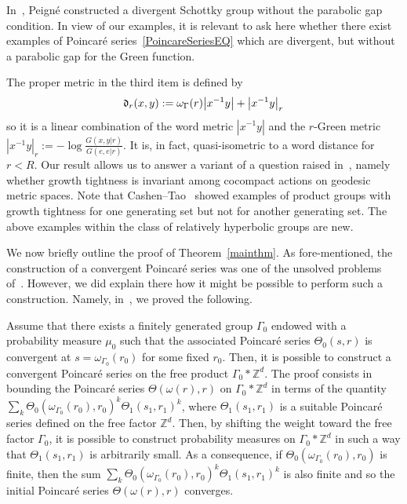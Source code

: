 \documentclass[AHL,Unicode,longabstracts]{cedram}
\newcommand{\Z}{\mathbb{Z}}
\newcommand{\fkd}{\mathfrak{d}}
\let\originalleft\left
\let\originalright\right
\renewcommand{\left}{\mathopen{}\mathclose\bgroup\originalleft}
\renewcommand{\right}{\aftergroup\egroup\originalright}
\begin{document}
\begin{rema}
In~\cite{Peigne11}, Peigné constructed a divergent Schottky group without the parabolic gap condition. In view of our examples, it is relevant to ask here whether there exist examples of Poincaré series~\eqref{PoincareSeriesEQ} which are divergent, but without a parabolic gap for the Green function.
\end{rema}

\begin{rema}
The proper metric in the third item is defined by
\[
\fkd_r(x,y):=\omega_\Gamma(r)\left|x^{-1}y\right|+\left|x^{-1}y\right|_r
\]
so it is a linear combination of the word metric $|x^{-1}y|$ and the $r$-Green metric $|x^{-1}y|_r:=-\log \frac{G(x,y|r)}{G(e,e|r)}$. It is, in fact, quasi-isometric to a word distance for $r<R$. Our result allows us to answer a variant of a question raised in~\cite{ACT}, namely whether growth tightness is invariant among cocompact actions on geodesic metric spaces. Note that Cashen--Tao~\cite{CaTao16} showed examples of product groups with growth tightness for one generating set but not for another generating set. The above examples within the class of relatively hyperbolic groups are new.
\end{rema}


We now briefly outline the proof of Theorem~\ref{mainthm}. As fore-mentioned, the construction of a convergent Poincaré series was one of the unsolved problems of~\cite{DWY}. However, we did explain there how it might be possible to perform such a construction. Namely, in~\cite[Example~C]{DWY}, we proved the following.

Assume that there exists a finitely generated group $\Gamma_0$ endowed with a probability measure $\mu_0$ such that the associated Poincaré series $\Theta_0(s,r)$ is convergent at $s=\omega_{{\Gamma_0}}(r_0)$ for some fixed $r_0$. Then, it is possible to construct a convergent Poincaré series on the free product $\Gamma_0*\Z^d$. The proof consists in bounding the Poincaré series $\Theta(\omega(r),r)$ on $\Gamma_0*\Z^d$ in terms of the quantity $\sum_{k}\Theta_0(\omega_{{\Gamma_0}}(r_0),r_0)^k\Theta_1(s_1,r_1)^k$, where $\Theta_1(s_1,r_1)$ is a suitable Poincaré series defined on the free factor $\Z^d$. Then, by shifting the weight toward the free factor $\Gamma_0$, it is possible to construct probability measures on $\Gamma_0*\Z^d$ in such a way that $\Theta_1(s_1,r_1)$ is arbitrarily small. As a consequence, if $\Theta_0(\omega_{{\Gamma_0}}(r_0),r_0)$ is finite, then the sum $\sum_{k}\Theta_0(\omega_{{\Gamma_0}}(r_0),r_0)^k\Theta_1(s_1,r_1)^k$ is also finite and so the initial Poincaré series $\Theta(\omega(r),r)$ converges.
\end{document}
